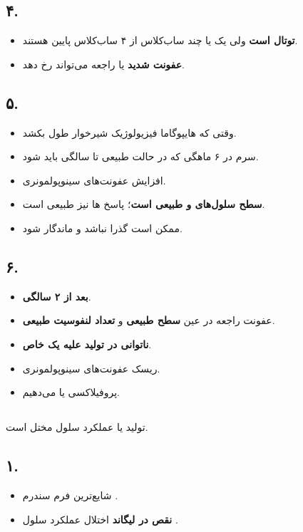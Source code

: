 \documentclass[12pt,a4paper]{article}
\begin{document}
\subsection*{۴. }
\begin{itemize}
\item \textbf{ توتال  است} ولی یک یا چند ساب‌کلاس از ۴ ساب‌کلاس پایین هستند.
\item \textbf{عفونت شدید} یا راجعه می‌تواند رخ دهد.
\end{itemize}

\subsection*{۵. }
\begin{itemize}
\item وقتی که هایپوگاما فیزیولوژیک شیرخوار طول بکشد.
\item {} سرم در ۶ ماهگی که در حالت طبیعی تا
 سالگی باید  شود.
\item افزایش عفونت‌های سینوپولمونری.
\item \textbf{سطح سلول‌های  و  طبیعی است}؛ پاسخ ها نیز طبیعی است.
\item ممکن است گذرا نباشد و ماندگار شود.
\end{itemize}

\subsection*{۶. }
\begin{itemize}
\item \textbf{بعد از ۲ سالگی}.
\item عفونت راجعه در عین \textbf{سطح  طبیعی} و \textbf{تعداد لنفوسیت طبیعی}.
\item \textbf{ناتوانی در تولید  علیه یک  خاص}.
\item ریسک عفونت‌های سینوپولمونری.
\item {} پروفیلاکسی یا  می‌دهیم.
\end{itemize}

\subsection*{}
تولید یا عملکرد سلول  مختل است.

\subsection*{۱. }
\begin{itemize}
\item شایع‌ترین فرم سندرم .
\item \textbf{نقص در لیگاند } \LDarrow{} اختلال عملکرد سلول .
\end{itemize}
\end{document}
